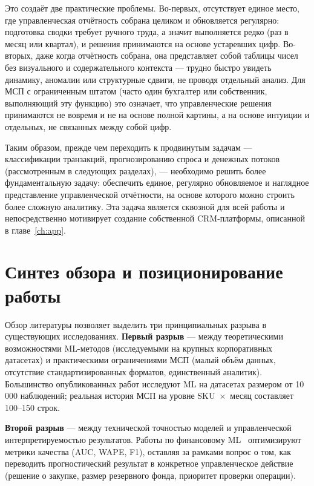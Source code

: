 Это создаёт две практические проблемы. Во-первых, отсутствует единое место, где управленческая отчётность собрана целиком и обновляется регулярно: подготовка сводки требует ручного труда, а значит выполняется редко (раз в месяц или квартал), и решения принимаются на основе устаревших цифр. Во-вторых, даже когда отчётность собрана, она представляет собой таблицы чисел без визуального и содержательного контекста --- трудно быстро увидеть динамику, аномалии или структурные сдвиги, не проводя отдельный анализ. Для МСП с ограниченным штатом (часто один бухгалтер или собственник, выполняющий эту функцию) это означает, что управленческие решения принимаются не вовремя и не на основе полной картины, а на основе интуиции и отдельных, не связанных между собой цифр.

Таким образом, прежде чем переходить к продвинутым задачам --- классификации транзакций, прогнозированию спроса и денежных потоков (рассмотренным в следующих разделах), --- необходимо решить более фундаментальную задачу: обеспечить единое, регулярно обновляемое и наглядное представление управленческой отчётности, на основе которого можно строить более сложную аналитику. Эта задача является сквозной для всей работы и непосредственно мотивирует создание собственной CRM-платформы, описанной в главе~\ref{ch:app}.

\section{Синтез обзора и позиционирование работы}

Обзор литературы позволяет выделить три принципиальных разрыва в существующих исследованиях. \textbf{Первый разрыв} --- между теоретическими возможностями ML-методов (исследуемыми на крупных корпоративных датасетах) и практическими ограничениями МСП (малый объём данных, отсутствие стандартизированных форматов, единственный аналитик). Большинство опубликованных работ исследуют ML на датасетах размером от 10\,000 наблюдений; реальная история МСП на уровне SKU~$\times$~месяц составляет 100--150 строк.

\textbf{Второй разрыв} --- между технической точностью моделей и управленческой интерпретируемостью результатов. Работы по финансовому ML~\cite{lopezdeprado2018advances,khandani2010consumer} оптимизируют метрики качества (AUC, WAPE, F1), оставляя за рамками вопрос о том, как переводить прогностический результат в конкретное управленческое действие (решение о закупке, размер резервного фонда, приоритет проверки операции).

